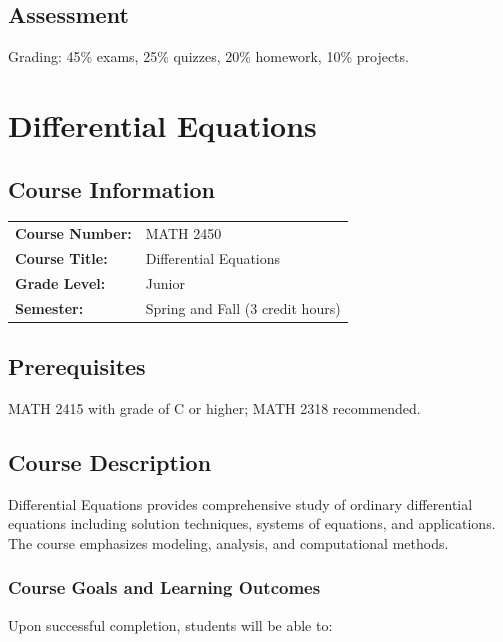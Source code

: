 \documentclass[12pt,oneside]{book}
\begin{document}
\section{Assessment}

Grading: 45\% exams, 25\% quizzes, 20\% homework, 10\% projects.


\chapter{Differential Equations}

\section{Course Information}

\begin{tabular}{ll}
\textbf{Course Number:} & MATH 2450 \\
\textbf{Course Title:} & Differential Equations \\
\textbf{Grade Level:} & Junior \\
\textbf{Semester:} & Spring and Fall (3 credit hours) \\
\end{tabular}

\section{Prerequisites}

MATH 2415 with grade of C or higher; MATH 2318 recommended.

\section{Course Description}

Differential Equations provides comprehensive study of ordinary differential equations including solution techniques, systems of equations, and applications. The course emphasizes modeling, analysis, and computational methods.

\subsection{Course Goals and Learning Outcomes}

Upon successful completion, students will be able to:
\end{document}
